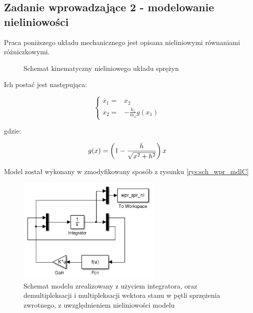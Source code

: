 \documentclass[12pt]{article}
\begin{document}
\newpage

\subsection{Zadanie wprowadzające 2 - modelowanie nieliniowości}

Praca poniższego układu mechanicznego jest opisana nieliniowymi równaniami
różniczkowymi.

\begin{figure}[!htb]
	\begin{center}
		
		\caption{Schemat kinematyczny nieliniowego układu sprężyn}
		\label{rys:wpr_spr_nl_sch}
	\end{center}
\end{figure}

Ich postać jest następująca:

\begin{equation}
	\begin{cases}
		\dot{x_1} = & x_2 \\
		\dot{x_2} = & -\frac{k_1}{m_1}g(x_1)
	\end{cases}
\end{equation}

gdzie:

\begin{equation}
	g(x) = \left(1-\frac{h}{\sqrt{x^2+h^2}}\right)x \\[0.5cm]
\end{equation}

Model został wykonany w zmodyfikowany sposób z rysunku \ref{rys:sch_wpr_mdlC}

\begin{figure}[!htb]
	\begin{center}
		\includegraphics[width=7cm]{../res/img/wpr_spr_nl_mdl.png}
	\end{center} 
	\caption{Schemat modelu zrealizowany z użyciem integratora, oraz
	demultipleksacji i multipleksacji wektora stanu w pętli sprzężenia zwrotnego,
	z uwzględnieniem nieliniowości modelu}
	\label{rys:wpr_spr_nl_mdl}
\end{figure}
\end{document}
